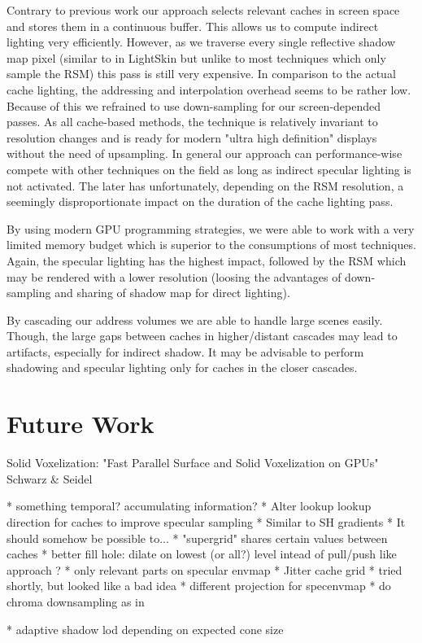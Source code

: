 \documentclass[thesis.tex]{subfiles}
\begin{document}
Contrary to previous work our approach selects relevant caches in screen space and stores them in a continuous buffer.
This allows us to compute indirect lighting very efficiently.
However, as we traverse every single reflective shadow map pixel (similar to in LightSkin \cite{bib:LightskinPaper} but unlike to most techniques which only sample the RSM) this pass is still very expensive.
In comparison to the actual cache lighting, the addressing and interpolation overhead seems to be rather low.
Because of this we refrained to use down-sampling for our screen-depended passes.
As all cache-based methods, the technique is relatively invariant to resolution changes and is ready for modern "ultra  high definition" displays without the need of upsampling.
In general our approach can performance-wise compete with other techniques on the field as long as indirect specular lighting is not activated.
The later has unfortunately, depending on the RSM resolution, a seemingly disproportionate impact on the duration of the cache lighting pass.

By using modern GPU programming strategies, we were able to work with a very limited memory budget which is superior to the consumptions of most techniques.
Again, the specular lighting has the highest impact, followed by the RSM which may be rendered with a lower resolution (loosing the advantages of down-sampling and sharing of shadow map for direct lighting).

By cascading our address volumes we are able to handle large scenes easily.
Though, the large gaps between caches in higher/distant cascades may lead to artifacts, especially for indirect shadow.
It may be advisable to perform shadowing and specular lighting only for caches in the closer cascades.



\section{Future Work}

Solid Voxelization: "Fast Parallel Surface and Solid Voxelization on GPUs"  Schwarz \& Seidel 


* something temporal? accumulating information?
* Alter lookup lookup direction for caches to improve specular sampling
  * Similar to SH gradients
  * It should somehow be possible to...
* "supergrid" shares certain values between caches
* better fill hole: dilate on lowest (or all?) level intead of pull/push like approach ?
* only relevant parts on specular envmap
* Jitter cache grid
  * tried shortly, but looked like a bad idea
* different projection for specenvmap
* do chroma downsampling as in \cite{bib:radiancecachechromaticcompression}

* adaptive shadow lod depending on expected cone size

\subfilebib %
\end{document}
